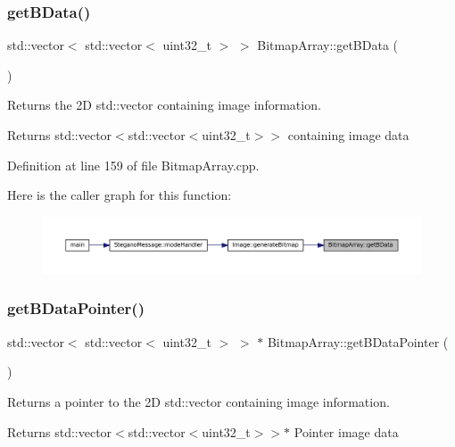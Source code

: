 \subsubsection{\texorpdfstring{getBData()}{getBData()}}
{\footnotesize\ttfamily std\+::vector$<$ std\+::vector$<$ uint32\+\_\+t $>$ $>$ Bitmap\+Array\+::get\+B\+Data (\begin{DoxyParamCaption}{ }\end{DoxyParamCaption})}



Returns the 2D std\+::vector containing image information. 

\begin{DoxyReturn}{Returns}
std\+::vector$<$std\+::vector$<$uint32\+\_\+t$>$$>$ containing image data 
\end{DoxyReturn}


Definition at line 159 of file Bitmap\+Array.\+cpp.

Here is the caller graph for this function\+:\nopagebreak
\begin{figure}[H]
\begin{center}
\leavevmode
\includegraphics[width=350pt]{classBitmapArray_a66bd389c357de601df924569a0b38429_icgraph}
\end{center}
\end{figure}
\mbox{\label{classBitmapArray_ab914d6282460b386b2b5f936190487a2}} 
\subsubsection{\texorpdfstring{getBDataPointer()}{getBDataPointer()}}
{\footnotesize\ttfamily std\+::vector$<$ std\+::vector$<$ uint32\+\_\+t $>$ $>$ $\ast$ Bitmap\+Array\+::get\+B\+Data\+Pointer (\begin{DoxyParamCaption}{ }\end{DoxyParamCaption})}



Returns a pointer to the 2D std\+::vector containing image information. 

\begin{DoxyReturn}{Returns}
std\+::vector$<$std\+::vector$<$uint32\+\_\+t$>$$>$$\ast$ Pointer image data 
\end{DoxyReturn}


